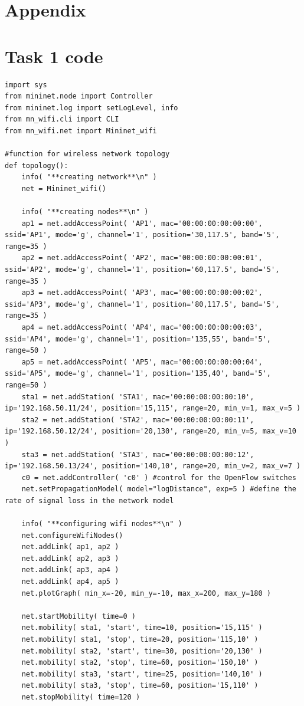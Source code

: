 \documentclass{article}
\begin{document}
\newpage
\section{Appendix}
\renewcommand{\thesection}{\alph{section}}
\setcounter{section}{0}
\section{Task 1 code}
\begin{lstlisting}
import sys
from mininet.node import Controller
from mininet.log import setLogLevel, info
from mn_wifi.cli import CLI
from mn_wifi.net import Mininet_wifi

#function for wireless network topology
def topology():
    info( "**creating network**\n" )
    net = Mininet_wifi()

    info( "**creating nodes**\n" )
    ap1 = net.addAccessPoint( 'AP1', mac='00:00:00:00:00:00', ssid='AP1', mode='g', channel='1', position='30,117.5', band='5', range=35 )
    ap2 = net.addAccessPoint( 'AP2', mac='00:00:00:00:00:01', ssid='AP2', mode='g', channel='1', position='60,117.5', band='5', range=35 )
    ap3 = net.addAccessPoint( 'AP3', mac='00:00:00:00:00:02', ssid='AP3', mode='g', channel='1', position='80,117.5', band='5', range=35 )
    ap4 = net.addAccessPoint( 'AP4', mac='00:00:00:00:00:03', ssid='AP4', mode='g', channel='1', position='135,55', band='5', range=50 )
    ap5 = net.addAccessPoint( 'AP5', mac='00:00:00:00:00:04', ssid='AP5', mode='g', channel='1', position='135,40', band='5', range=50 )
    sta1 = net.addStation( 'STA1', mac='00:00:00:00:00:10', ip='192.168.50.11/24', position='15,115', range=20, min_v=1, max_v=5 )
    sta2 = net.addStation( 'STA2', mac='00:00:00:00:00:11', ip='192.168.50.12/24', position='20,130', range=20, min_v=5, max_v=10 )
    sta3 = net.addStation( 'STA3', mac='00:00:00:00:00:12', ip='192.168.50.13/24', position='140,10', range=20, min_v=2, max_v=7 )
    c0 = net.addController( 'c0' ) #control for the OpenFlow switches
    net.setPropagationModel( model="logDistance", exp=5 ) #define the rate of signal loss in the network model

    info( "**configuring wifi nodes**\n" )
    net.configureWifiNodes()
    net.addLink( ap1, ap2 )
    net.addLink( ap2, ap3 )
    net.addLink( ap3, ap4 )
    net.addLink( ap4, ap5 )
    net.plotGraph( min_x=-20, min_y=-10, max_x=200, max_y=180 )

    net.startMobility( time=0 )
    net.mobility( sta1, 'start', time=10, position='15,115' )
    net.mobility( sta1, 'stop', time=20, position='115,10' )
    net.mobility( sta2, 'start', time=30, position='20,130' )
    net.mobility( sta2, 'stop', time=60, position='150,10' )
    net.mobility( sta3, 'start', time=25, position='140,10' )
    net.mobility( sta3, 'stop', time=60, position='15,110' )
    net.stopMobility( time=120 )


\end{lstlisting}
\end{document}
